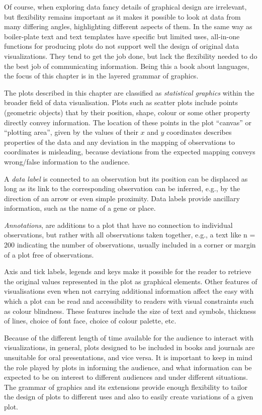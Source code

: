 \documentclass[krantz2]{krantz}\usepackage{knitr}
\begin{document}
Of course, when exploring data fancy details of graphical design are irrelevant, but flexibility remains important as it makes it possible to look at data from many differing angles, highlighting different aspects of them. In the same way as boiler-plate text and text templates have specific but limited uses, all-in-one functions for producing plots do not support well the design of original data visualizations. They tend to get the job done, but lack the flexibility needed to do the best job of communicating information. Being this a book about languages, the focus of this chapter is in the layered grammar of graphics.

The plots described in this chapter are classified as \emph{statistical graphics} within the broader field of data visualisation. Plots such as scatter plots include points (geometric objects) that by their position, shape, colour or some other property directly convey information. The location of these points in the plot ``canvas'' or ``plotting area'', given by the values of their $x$ and $y$ coordinates describes properties of the data and any deviation in the mapping of observations to coordinates is misleading, because deviations from the expected mapping conveys wrong/false information to the audience.

A \emph{data label} is connected to an observation but its position can be displaced as long as its link to the corresponding observation can be inferred, e.g., by the direction of an arrow or even simple proximity. Data labels provide ancillary information, such as the name of a gene or place.

\emph{Annotations}, are additions to a plot that have no connection to individual observations, but rather with all observations taken together, e.g., a text like n = 200 indicating the number of observations, usually included in a corner or margin of a plot free of observations.

Axis and tick labels, legends and keys make it possible for the reader to retrieve the original values represented in the plot as graphical elements. Other features of visualisations even when not carrying additional information affect the easy with which a plot can be read and accessibility to readers with visual constraints such as colour blindness. These features include the size of text and symbols, thickness of lines, choice of font face, choice of colour palette, etc.

Because of the different length of time available for the audience to interact with visualizations, in general, plots designed to be included in books and journals are unsuitable for oral presentations, and vice versa. It is important to keep in mind the role played by plots in informing the audience, and what information can be expected to be on interest to different audiences and under different situations. The grammar of graphics and its extensions provide enough flexibility to tailor the design of plots to different uses and also to easily create variations of a given plot.
\end{document}
